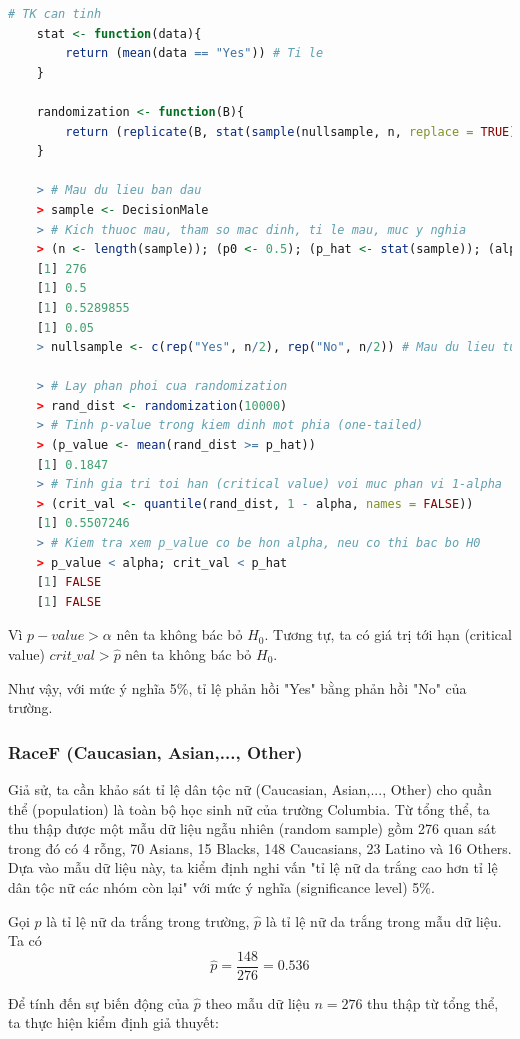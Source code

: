 \documentclass[a4paper,12pt]{article}
\begin{document}
	\begin{lstlisting}[language=R]
	# TK can tinh
	stat <- function(data){
		return (mean(data == "Yes")) # Ti le
	}
	
	randomization <- function(B){
		return (replicate(B, stat(sample(nullsample, n, replace = TRUE))))
	}
	
	> # Mau du lieu ban dau
	> sample <- DecisionMale
	> # Kich thuoc mau, tham so mac dinh, ti le mau, muc y nghia
	> (n <- length(sample)); (p0 <- 0.5); (p_hat <- stat(sample)); (alpha <- 0.05)
	[1] 276
	[1] 0.5
	[1] 0.5289855
	[1] 0.05
	> nullsample <- c(rep("Yes", n/2), rep("No", n/2)) # Mau du lieu tuong ung voi H0
	
	> # Lay phan phoi cua randomization
	> rand_dist <- randomization(10000)
	> # Tinh p-value trong kiem dinh mot phia (one-tailed)
	> (p_value <- mean(rand_dist >= p_hat))
	[1] 0.1847
	> # Tinh gia tri toi han (critical value) voi muc phan vi 1-alpha
	> (crit_val <- quantile(rand_dist, 1 - alpha, names = FALSE))
	[1] 0.5507246
	> # Kiem tra xem p_value co be hon alpha, neu co thi bac bo H0
	> p_value < alpha; crit_val < p_hat
	[1] FALSE
	[1] FALSE
	\end{lstlisting}
	
	Vì $p-value > \alpha$ nên ta không bác bỏ $H_0$. Tương tự, ta có giá trị tới hạn (critical value) $crit\_val > \hat{p}$ nên ta không bác bỏ $H_0$. 
	
	Như vậy, với mức ý nghĩa 5\%, tỉ lệ phản hồi "Yes" bằng phản hồi "No" của trường. 
	
	\subsubsection{RaceF (Caucasian, Asian,..., Other)}
	Giả sử, ta cần khảo sát tỉ lệ dân tộc nữ (Caucasian, Asian,..., Other) cho quần thể (population) là toàn bộ học sinh nữ của trường Columbia. Từ tổng thể, ta thu thập được một mẫu dữ liệu ngẫu nhiên (random sample) gồm 276 quan sát trong đó có 4 rỗng, 70 Asians, 15 Blacks, 148 Caucasians, 23 Latino và 16 Others. Dựa vào mẫu dữ liệu này, ta kiểm định nghi vấn "tỉ lệ nữ da trắng cao hơn tỉ lệ dân tộc nữ các nhóm còn lại" với mức ý nghĩa (significance level) 5\%.
		
	Gọi $p$ là tỉ lệ nữ da trắng trong trường, $\hat{p}$ là tỉ lệ nữ da trắng trong mẫu dữ liệu. Ta có
	$$\hat{p} = \frac{148}{276} = 0.536$$
	
	Để tính đến sự biến động của $\hat{p}$ theo mẫu dữ liệu $n = 276$ thu thập từ tổng thể, ta thực hiện kiểm định giả thuyết:
	
\end{document}
